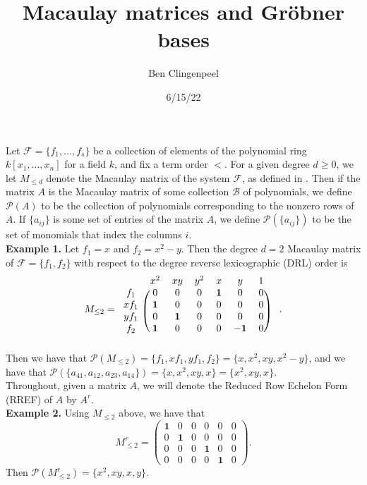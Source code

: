 \documentclass[12pt]{article}
\title{Macaulay matrices and Gröbner bases}
\author{Ben Clingenpeel}
\date{6/15/22}
\newcommand{\Poly}{\mathscr{P}}
\newcommand{\F}{\mathcal{F}}
\begin{document}
\maketitle

Let $\mathcal{F} = \{f_1, \dots, f_s\}$ be a collection of elements of the polynomial ring $k[x_1, \dots, x_n]$ for a field $k$, and fix a term order $<$. For a given degree $d \geq 0$, we let $M_{\leq d}$ denote the Macaulay matrix of the system $\F$, as defined in \cite{caminata2020solving}. Then if the matrix $A$ is the Macaulay matrix of some collection $\mathcal{B}$ of polynomials, we define $\Poly(A)$ to be the collection of polynomials corresponding to the nonzero rows of $A$. If $\{a_{ij}\}$ is some set of entries of the matrix $A$, we define $\Poly(\{a_{ij}\})$ to be the set of monomials that index the columns $i$. \\

\noindent \textbf{Example 1.} Let $f_1 = x$ and $f_2 = x^2 - y$. Then the degree $d = 2$ Macaulay matrix of $\F = \{f_1, f_2\}$ with respect to the degree reverse lexicographic (DRL) order is \[ M_{\leq 2} = \begin{blockarray}{ccccccc}
    & x^2 & xy & y^2 & x & y & 1 \\
    \begin{block}{c(cccccc)}
        f_1 & 0 & 0 & 0 & \mathbf{1} & 0 & 0 \\
        xf_1 & \mathbf{1} & 0 & 0 & 0 & 0 & 0 \\
        yf_1 & 0 & \mathbf{1} & 0 & 0 & 0 & 0 \\
        f_2 & \mathbf{1} & 0 & 0 & 0 & \mathbf{-1} & 0 \\
    \end{block}
\end{blockarray} \quad . \] Then we have that $\Poly(M_{\leq 2}) = \{f_1, xf_1, yf_1, f_2\} = \{x, x^2, xy, x^2 - y\}$, and we have that $\Poly(\{a_{41}, a_{12}, a_{23}, a_{14}\}) = \{x, x^2, xy, x\} = \{x^2, xy, x\}$. \\ 

Throughout, given a matrix $A$, we will denote the Reduced Row Echelon Form (RREF) of $A$ by $A^r$. \\

\noindent \textbf{Example 2.} Using $M_{\leq 2}$ above, we have that \[ M_{\leq 2}^r = \begin{pmatrix}
	\mathbf{1} & 0 & 0 & 0 & 0 & 0 \\
	0 & \mathbf{1} & 0 & 0 & 0 & 0 \\
	0 & 0 & 0 & \mathbf{1} & 0 & 0 \\
	0 & 0 & 0 & 0 & \mathbf{1} & 0
\end{pmatrix}. \] Then $\Poly(M_{\leq 2}^r) = \{x^2, xy, x, y\}$. \\
\end{document}
